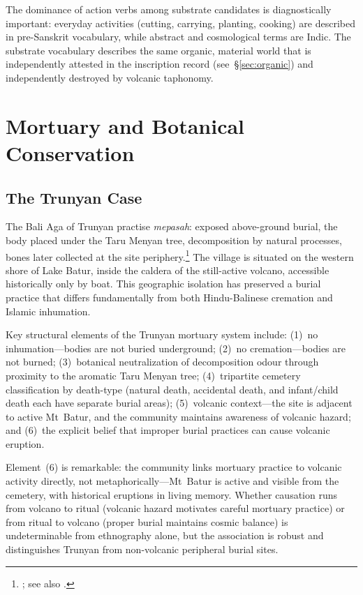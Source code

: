 \documentclass[12pt,a4paper]{article}
\begin{document}
The dominance of action verbs among substrate candidates is diagnostically important: everyday activities (cutting, carrying, planting, cooking) are described in pre-Sanskrit vocabulary, while abstract and cosmological terms are Indic. The substrate vocabulary describes the same organic, material world that is independently attested in the inscription record (see~\S\ref{sec:organic}) and independently destroyed by volcanic taphonomy.

\section{Mortuary and Botanical Conservation}
\label{sec:mortuary}

\subsection{The Trunyan Case}

The Bali Aga of Trunyan practise \emph{mepasah}: exposed above-ground burial, the body placed under the Taru Menyan tree, decomposition by natural processes, bones later collected at the site periphery.\footnote{\autocite{danandjaja1980kebudayaan}; see also \autocite{astiti2005trunyan}.} The village is situated on the western shore of Lake Batur, inside the caldera of the still-active volcano, accessible historically only by boat. This geographic isolation has preserved a burial practice that differs fundamentally from both Hindu-Balinese cremation and Islamic inhumation.

Key structural elements of the Trunyan mortuary system include: (1)~no inhumation---bodies are not buried underground; (2)~no cremation---bodies are not burned; (3)~botanical neutralization of decomposition odour through proximity to the aromatic Taru Menyan tree; (4)~tripartite cemetery classification by death-type (natural death, accidental death, and infant/child death each have separate burial areas); (5)~volcanic context---the site is adjacent to active Mt~Batur, and the community maintains awareness of volcanic hazard; and (6)~the explicit belief that improper burial practices can cause volcanic eruption.

Element~(6) is remarkable: the community links mortuary practice to volcanic activity directly, not metaphorically---Mt~Batur is active and visible from the cemetery, with historical eruptions in living memory. Whether causation runs from volcano to ritual (volcanic hazard motivates careful mortuary practice) or from ritual to volcano (proper burial maintains cosmic balance) is undeterminable from ethnography alone, but the association is robust and distinguishes Trunyan from non-volcanic peripheral burial sites.
\end{document}
